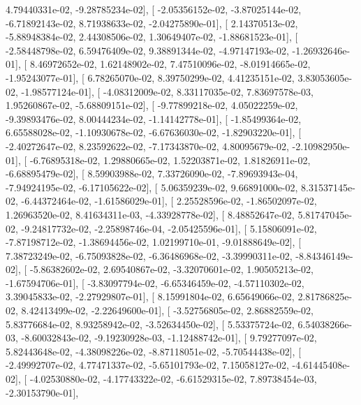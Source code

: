 \documentclass{article}
\begin{document}
          4.79440331e-02,  -9.28785234e-02],
       [ -2.05356152e-02,  -3.87025144e-02,  -6.71892143e-02,
          8.71938633e-02,  -2.04275890e-01],
       [  2.14370513e-02,  -5.88948384e-02,   2.44308506e-02,
          1.30649407e-02,  -1.88681523e-01],
       [ -2.58448798e-02,   6.59476409e-02,   9.38891344e-02,
         -4.97147193e-02,  -1.26932646e-01],
       [  8.46972652e-02,   1.62148902e-02,   7.47510096e-02,
         -8.01914665e-02,  -1.95243077e-01],
       [  6.78265070e-02,   8.39750299e-02,   4.41235151e-02,
          3.83053605e-02,  -1.98577124e-01],
       [ -4.08312009e-02,   8.33117035e-02,   7.83697578e-03,
          1.95260867e-02,  -5.68809151e-02],
       [ -9.77899218e-02,   4.05022259e-02,  -9.39893476e-02,
          8.00444234e-02,  -1.14142778e-01],
       [ -1.85499364e-02,   6.65588028e-02,  -1.10930678e-02,
         -6.67636030e-02,  -1.82903220e-01],
       [ -2.40272647e-02,   8.23592622e-02,  -7.17343870e-02,
          4.80095679e-02,  -2.10982950e-01],
       [ -6.76895318e-02,   1.29880665e-02,   1.52203871e-02,
          1.81826911e-02,  -6.68895479e-02],
       [  8.59903988e-02,   7.33726090e-02,  -7.89693943e-04,
         -7.94924195e-02,  -6.17105622e-02],
       [  5.06359239e-02,   9.66891000e-02,   8.31537145e-02,
         -6.44372464e-02,  -1.61586029e-01],
       [  2.25528596e-02,  -1.86502097e-02,   1.26963520e-02,
          8.41634311e-03,  -4.33928778e-02],
       [  8.48852647e-02,   5.81747045e-02,  -9.24817732e-02,
         -2.25898746e-04,  -2.05425596e-01],
       [  5.15806091e-02,  -7.87198712e-02,  -1.38694456e-02,
          1.02199710e-01,  -9.01888649e-02],
       [  7.38723249e-02,  -6.75093828e-02,  -6.36486968e-02,
         -3.39990311e-02,  -8.84346149e-02],
       [ -5.86382602e-02,   2.69540867e-02,  -3.32070601e-02,
          1.90505213e-02,  -1.67594706e-01],
       [ -3.83097794e-02,  -6.65346459e-02,  -4.57110302e-02,
          3.39045833e-02,  -2.27929807e-01],
       [  8.15991804e-02,   6.65649066e-02,   2.81786825e-02,
          8.42413499e-02,  -2.22649600e-01],
       [ -3.52756805e-02,   2.86882559e-02,   5.83776684e-02,
          8.93258942e-02,  -3.52634450e-02],
       [  5.53375724e-02,   6.54038266e-03,  -8.60032843e-02,
         -9.19230928e-03,  -1.12488742e-01],
       [  9.79277097e-02,   5.82443648e-02,  -4.38098226e-02,
         -8.87118051e-02,  -5.70544438e-02],
       [ -2.49992707e-02,   4.77471337e-02,  -5.65101793e-02,
          7.15058127e-02,  -4.61445408e-02],
       [ -4.02530880e-02,  -4.17743322e-02,  -6.61529315e-02,
          7.89738454e-03,  -2.30153790e-01],
\end{document}
